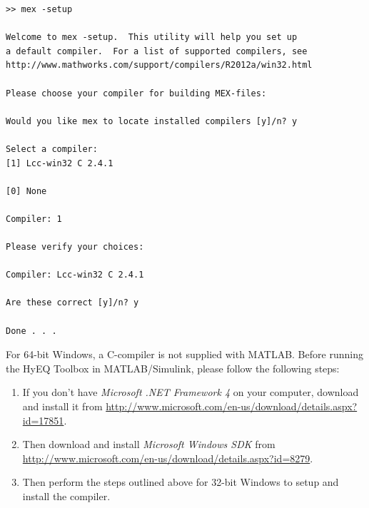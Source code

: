 \documentclass{article}
\begin{document}
\begin{verbatim}
>> mex -setup

Welcome to mex -setup.  This utility will help you set up
a default compiler.  For a list of supported compilers, see
http://www.mathworks.com/support/compilers/R2012a/win32.html

Please choose your compiler for building MEX-files:

Would you like mex to locate installed compilers [y]/n? y

Select a compiler:
[1] Lcc-win32 C 2.4.1

[0] None

Compiler: 1

Please verify your choices:

Compiler: Lcc-win32 C 2.4.1

Are these correct [y]/n? y

Done . . .
\end{verbatim}

For 64-bit Windows, a C-compiler is not supplied with MATLAB. Before running the HyEQ Toolbox in MATLAB/Simulink, please follow the following steps:

\begin{enumerate}
\item If you don't have {\em Microsoft .NET Framework 4} on your computer, download and install it from
\url{http://www.microsoft.com/en-us/download/details.aspx?id=17851}.
\item Then download and install {\em Microsoft Windows SDK} from
\url{http://www.microsoft.com/en-us/download/details.aspx?id=8279}.
\item Then perform the steps outlined above for 32-bit Windows to setup and install the compiler.
\end{enumerate}
\end{document}
